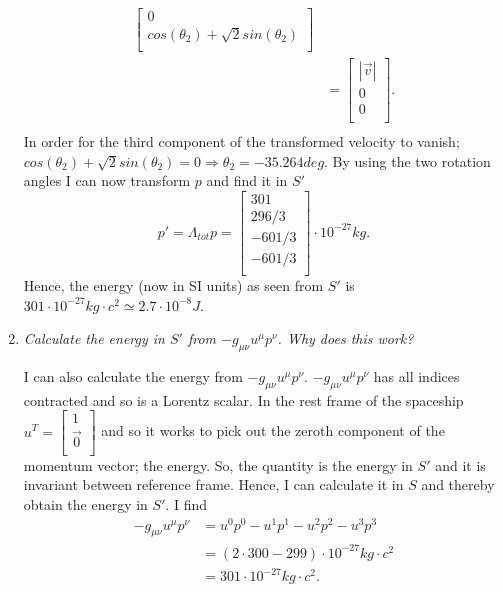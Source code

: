 \begin{example}
\begin{enumerate}
\begin{equation}
\begin{split}
\begin{bmatrix}
					0\\
					cos(\theta_2)+\sqrt{2}sin(\theta_2)\\
				\end{bmatrix}\\
				&=\begin{bmatrix}
					|\vec{v}|\\
					0\\
					0\\
				\end{bmatrix}.\\
			\end{split}
		\end{equation} 
		In order for the third component of the transformed velocity to vanish; $cos(\theta_2)+\sqrt{2}sin(\theta_2)=0\Rightarrow \theta_2=-35.264 deg$. By using the two rotation angles I can now transform $p$ and find it in $S'$
		\begin{equation}
			p'=\Lambda_{tot}p=\begin{bmatrix}
				301 \\
				296/3\\
				-601/3\\
				-601/3\\
			\end{bmatrix}\cdot 10^{-27}kg.
		\end{equation} 
		Hence, the energy (now in SI units) as seen from $S'$ is $301\cdot 10^{-27}kg\cdot c^2\simeq 2.7\cdot 10^{-8}J$.
		
		\item \emph{Calculate the energy in $S'$ from $-g_{\mu\nu}u^\mu p^\nu$. Why does this work?}
		
		I can also calculate the energy from $-g_{\mu\nu}u^\mu p^\nu$. $-g_{\mu\nu}u^\mu p^\nu$ has all indices contracted and so is a Lorentz scalar. In the rest frame of the spaceship $u^T=\begin{bmatrix}
			1 \\\vec{0}\\
		\end{bmatrix}$ and so it works to pick out the zeroth component of the momentum vector; the energy. So, the quantity is the energy in $S'$ and it is invariant between reference frame. Hence, I can calculate it in $S$ and thereby obtain the energy in $S'$. I find
		\begin{equation}
			\begin{split}
				-g_{\mu\nu}u^\mu p^\nu&=u^0p^0-u^1p^1-u^2p^2-u^3p^3\\
				&=(2\cdot 300-299)\cdot 10^{-27}kg\cdot c^2\\
				&=301\cdot 10^{-27}kg\cdot c^2.
			\end{split}
		\end{equation} 
	\end{enumerate}
\end{example}

